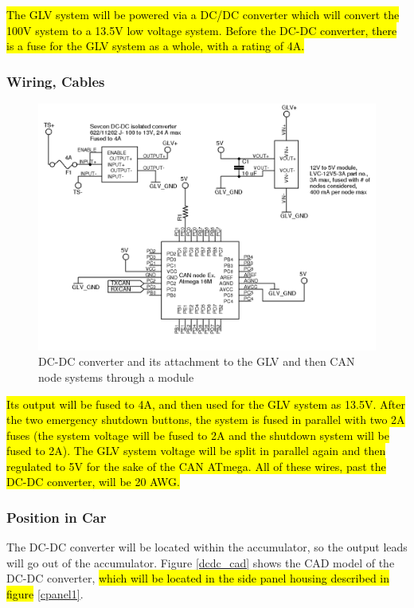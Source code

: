 \documentclass{article}
\DeclareRobustCommand{\hlr}[1]{{\sethlcolor{red}\hl{#1}}}
\begin{document}
            \hlr{The GLV system will be powered via a DC/DC converter which will convert the 100V system to a 13.5V low voltage system. Before the DC-DC converter, there is a fuse for the GLV system as a whole, with a rating of 4A.}

        \subsubsection{Wiring, Cables}

            \begin{figure}[H]
                \centering
                \includegraphics{CANnodepower}
                \caption{DC-DC converter and its attachment to the GLV and then CAN node systems through a module}
                \label{dc-dcglv}
            \end{figure}

            \hlr{Its output will be fused to 4A, and then used for the GLV system as 13.5V. After the two emergency shutdown buttons, the system is fused in parallel with two 2A fuses (the system voltage will be fused to 2A and the shutdown system will be fused to 2A). The GLV system voltage will be split in parallel again and then regulated to 5V for the sake of the CAN ATmega. All of these wires, past the DC-DC converter, will be 20 AWG.}

        \subsubsection{Position in Car}

            The DC-DC converter will be located within the accumulator, so the output leads will go out of the accumulator. Figure \ref{dcdc_cad} shows the CAD model of the DC-DC converter, \hlr{which will be located in the side panel housing described in figure} \ref{cpanel1}.
\end{document}
